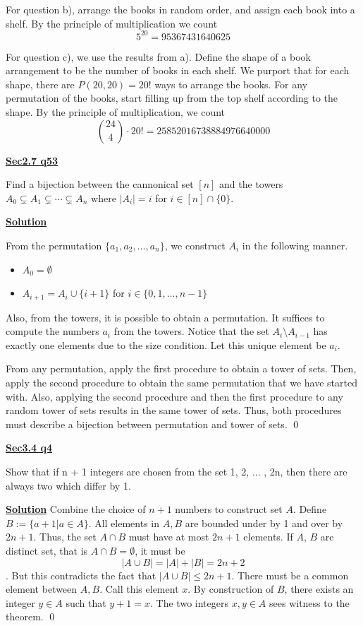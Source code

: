 \documentclass{article}
\newcommand{\new}[1]{
    \vspace{2mm}
    \noindent
    \textbf{
    \underline{#1}}
}
\newcommand{\m}{
    \cdot
}
\begin{document}
For question b), arrange the books in random order, and assign each 
book into a shelf. By the principle of multiplication we count
\[
    5^{20}= \boxed{95367431640625}
\]

For question c), we use the results from a). Define the shape of a 
book arrangement to be the number of books in each shelf. We purport that 
for each shape, there are $P(20, 20) = 20!$ ways to arrange the books. 
For any permutation of the books, start filling up from the top shelf according 
to the shape. By the principle of multiplication, we count 
\[
    \binom{24}{4} \m 20! = \boxed{25852016738884976640000}
\]

\new{Sec2.7 q53}
Find a bijection between the cannonical set $[n]$ and the towers 
$A_0 \subsetneq A_1 \subsetneq \cdots \subsetneq A_n$ where $|A_i| = i$
for $i \in [n] \cap \{0\}$. 

\new{Solution} 
From the permutation $\{a_1, a_2, \dots, a_n\}$, we construct 
$A_i$ in the following manner. 
\begin{itemize}
    \item $A_0 = \emptyset$
    \item $A_{i+1} = A_i \cup \{i + 1\}$ for $i \in \{0, 1, \dots, n -1\}$
\end{itemize}

Also, from the towers, it is possible to obtain a permutation. It suffices 
to compute the numbers $a_i$ from the towers. Notice that the set 
$A_{i}\setminus A_{i -1}$ has exactly one elements due to the size 
condition. Let this unique element be $a_i$. 

From any permutation, apply the first procedure to obtain a tower of sets. 
Then, apply the second procedure to obtain the same permutation that 
we have started with. Also, applying the second procedure and then the 
first procedure to any random tower of sets results in the same tower of sets. 
Thus, both procedures must describe a bijection between permutation and tower of sets. 
\hfill \qed

\new{Sec3.4 q4}
Show that if n + 1 integers are chosen from the set {1, 2, ... , 2n}, then there are 
always two which differ by 1. 

\new{Solution} Combine the choice of $n+1$ numbers to construct 
set $A$. Define $B:=\{a+1|a\in A\}$. All elements in $A, B$ are 
bounded under by 1 and over by $2n+1$. Thus, the set $A\cap B$ must 
have at most $2n + 1$ elements. If $A$, $B$ are distinct set, that is 
$A \cap B = \emptyset$, it must be
\[
    |A \cup B| = |A|+|B| = 2n + 2
\] .
But this contradicts the fact that $|A\cup B| \leq 2n+1$. 
There must be a common element between $A, B$. Call this element $x$. 
By construction of $B$, there exists an integer $y \in A$ such that $y + 1 = x$. 
The two integers $x, y \in A$ sees witness to the theorem. 
\hfill \qed
\end{document}
